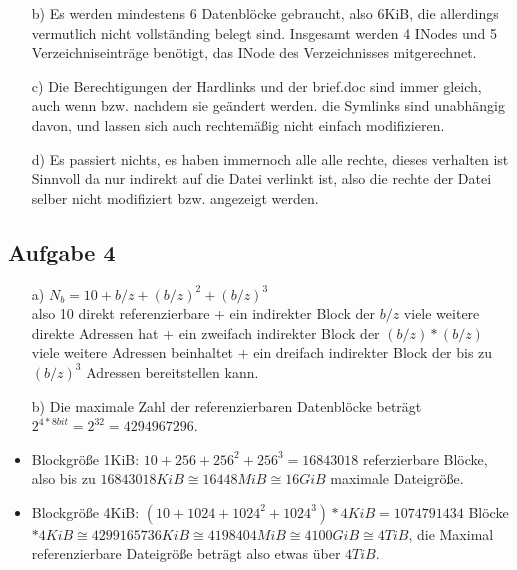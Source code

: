 \documentclass{scrartcl}
\begin{document}
\begin{itemize}

\item[b)]
Es werden mindestens 6 Datenblöcke gebraucht, also 6KiB, die allerdings vermutlich nicht vollständing belegt sind.
Insgesamt werden 4 INodes und 5 Verzeichniseinträge benötigt, das INode des Verzeichnisses mitgerechnet.


\item[c)]
Die Berechtigungen der Hardlinks und der brief.doc sind immer gleich, auch wenn bzw. nachdem sie
geändert werden. die Symlinks sind unabhängig davon, und lassen sich auch rechtemäßig nicht
einfach modifizieren.

\item[d)]
Es passiert nichts, es haben immernoch alle alle rechte, dieses verhalten ist Sinnvoll da nur indirekt auf die Datei
verlinkt ist, also die rechte der Datei selber nicht modifiziert bzw. angezeigt werden.

\end{itemize}

\subsection*{Aufgabe 4}
\begin{itemize}
\item[a)] $N_b = 10 + b / z + (b / z)^2 + (b / z)^3 $ \\
    also 10 direkt referenzierbare + ein indirekter Block der $b/z$ viele weitere direkte Adressen hat + ein
    zweifach indirekter Block der $(b/z)*(b/z)$ viele weitere Adressen beinhaltet + ein dreifach indirekter
    Block der bis zu $(b/z)^3$ Adressen bereitstellen kann.

\item[b)] Die maximale Zahl der referenzierbaren Datenblöcke beträgt
    $2^{4*8bit} = 2^{32} = 4294967296$.
    \item Blockgröße 1KiB: $10 + 256 + 256^2 + 256^3 = 16843018$ referzierbare Blöcke, also
    bis zu $16843018KiB \cong 16448MiB \cong 16GiB$ maximale Dateigröße.
    \item Blockgröße 4KiB: $(10 + 1024 + 1024^2 + 1024^3) * 4KiB = 1074791434$ Blöcke $* 4KiB \cong
    4299165736KiB \cong 4198404MiB \cong 4100GiB \cong 4TiB$, die Maximal referenzierbare
    Dateigröße beträgt also etwas über $4TiB$.

\end{itemize}
\end{document}
